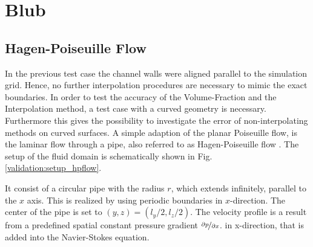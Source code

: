 \section{Blub}
\subsection{Hagen-Poiseuille Flow}

In the previous test case the channel walls were aligned parallel to the simulation grid. Hence, no further interpolation procedures
are necessary to mimic the exact boundaries.
In order to test the accuracy of the Volume-Fraction and the Interpolation method, a test case with a curved geometry is necessary.
Furthermore this gives the possibility to investigate the error of non-interpolating methods on curved surfaces.
A simple adaption of the planar Poiseuille flow, is the laminar flow through a pipe, also referred to as Hagen-Poiseuille flow \citep{tritton88}.
The setup of the fluid domain is schematically shown in Fig. \ref{validation:setup_hpflow}.

It consist of a circular pipe with the radius $r$, which extends infinitely, parallel to the $x$ axis.
This is realized by using periodic boundaries in $x$-direction.
The center of the pipe is set to $(y, z) = (l_y/2, l_z/2)$.
The velocity profile is a result from a predefined spatial constant pressure gradient $\nicefrac{\partial p}{\partial x}$.
in x-direction, that is added into the Navier-Stokes equation.


